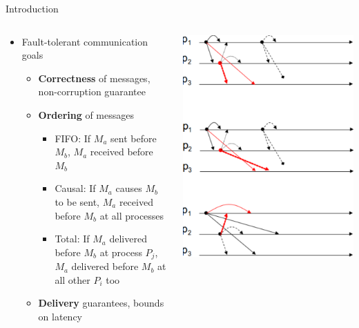 \documentclass[pdftex]{beamer}
\begin{document}
\begin{frame}{Introduction}
\begin{columns}
\begin{column}{.5\textwidth}

\begin{itemize}
	\item Fault-tolerant communication goals
	\begin{itemize}
		\item \textbf{Correctness} of messages, non-corruption guarantee
		\item \textbf{Ordering} of messages
		\begin{itemize}
			\item FIFO: If $M_a$ sent before $M_b$, $M_a$ received before $M_b$
			\item Causal: If $M_a$ causes $M_b$ to be sent, $M_a$ received before $M_b$ at all processes
			\item Total: If $M_a$ delivered before $M_b$ at process $P_j$, $M_a$ delivered before $M_b$ at all other $P_i$ too
		\end{itemize}
		\item \textbf{Delivery} guarantees, bounds on latency
	\end{itemize}
\end{itemize}
\end{column}
	
\begin{column}{.5\textwidth}
\includegraphics[width=\textwidth]{message_ordering_types}
\end{column}

\end{columns}
\end{frame}
\end{document}
